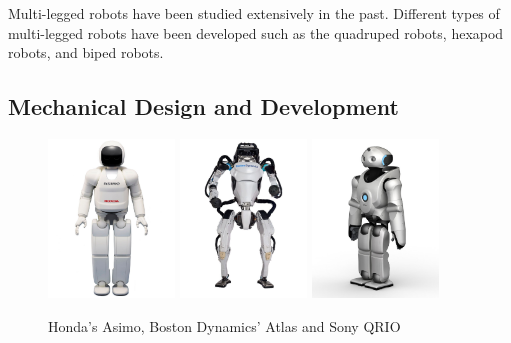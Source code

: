 Multi-legged robots have been studied extensively in the past.
Different types of multi-legged robots have been developed such as the quadruped robots, hexapod robots, and biped robots.
\subsection{Mechanical Design and Development}
\begin {figure}[h]
\centering
\includegraphics[width=0.3\textwidth]{Honda's Asimo}
\includegraphics[width=0.3\textwidth]{Boston Dynamics' Atlas}
\includegraphics[width=0.3\textwidth]{sony QRIO}
\caption{Honda's Asimo, Boston Dynamics' Atlas and Sony QRIO\cite{asimo}\cite{atlas}\cite{qrio}}
\label{fig:Asimo, Atlas and QRIO}
\end {figure}



